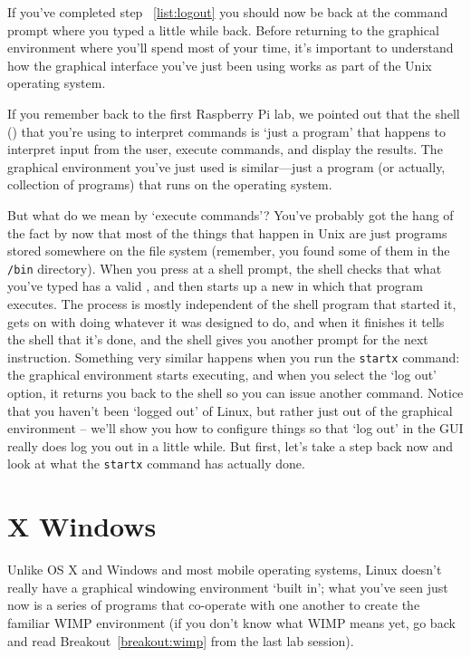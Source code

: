 
If you've completed step ~\ref{list:logout} you should now be back at the command prompt where you typed  a little while back. Before returning to the graphical environment where you'll spend most of your time, it's important to understand how the graphical interface you've just been using works as part of the Unix operating system.

If you remember back to the first Raspberry Pi lab, we pointed out that the shell () that you're using to interpret commands is `just a program' that happens to interpret input from the user, execute commands, and display the results. The graphical environment you've just used is similar---just a program (or actually, collection of programs) that runs on the operating system.

But what do we mean by `execute commands'? You've probably got the hang of the fact by now that most of the things that happen in Unix are just programs stored somewhere on the file system (remember, you found some of them in the \texttt{/bin} directory). When you press  at a shell prompt, the  shell checks that what you've typed has a valid , and then starts up a new  in which that program executes. The process is mostly independent of the shell program that started it, gets on with doing whatever it was designed to do, and when it finishes it tells the shell that it's done, and the shell gives you another prompt for the next instruction. Something very similar happens when you run the \texttt{startx} command: the graphical environment starts executing, and when you select the `log out' option, it returns you back to the shell so you can issue another command. Notice that you haven't been `logged out' of Linux, but rather just out of the graphical environment -- we'll show you how to configure things so that `log out' in the GUI really does log you out in a little while. But first, let's take a step back now and look at what the \texttt{startx} command has actually done.

\section{X Windows}

Unlike OS X and Windows and most mobile operating systems, Linux doesn't really have a graphical windowing environment `built in'; what you've seen just now is a series of programs that co-operate with one another to  create the familiar WIMP environment (if you don't know what WIMP means yet, go back and read Breakout~\ref{breakout:wimp} from the last lab session).

